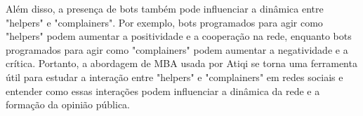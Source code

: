 Além disso, a presença de bots também pode influenciar a dinâmica entre "helpers" e "complainers". Por exemplo, bots programados para agir como "helpers" podem aumentar a positividade e a cooperação na rede, enquanto bots programados para agir como "complainers" podem aumentar a negatividade e a crítica. Portanto, a abordagem de MBA usada por Atiqi se torna uma ferramenta útil para estudar a interação entre "helpers" e "complainers" em redes sociais e entender como essas interações podem influenciar a dinâmica da rede e a formação da opinião pública.